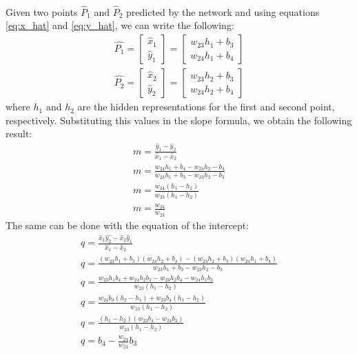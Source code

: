 \paragraph{}
Given two points $\hat{P}_1$ and $\hat{P}_2$ predicted by the network and using equations \ref{eq:x_hat} and \ref{eq:y_hat}, we can write the following:
\begin{equation}
    \begin{gathered}
        \hat{P_1} = \begin{bmatrix}
            \hat{x}_1 \\
            \hat{y}_1
        \end{bmatrix}
        = \begin{bmatrix}
            w_{23}h_1 + b_{3} \\
            w_{24}h_1 + b_{4}
        \end{bmatrix} \\
        \hat{P_2} = \begin{bmatrix}
            \hat{x}_2 \\
            \hat{y}_2
        \end{bmatrix}
        = \begin{bmatrix}
            w_{23}h_2 + b_{3} \\
            w_{24}h_2 + b_{4}
        \end{bmatrix}
    \end{gathered}
\end{equation}
where $h_1$ and $h_2$ are the hidden representations for the first and second point, respectively.
Substituting this values in the slope formula, we obtain the following result:
\begin{equation}
    \begin{gathered}
        m = \frac{\hat{y}_1 - \hat{y}_2}{\hat{x}_1 - \hat{x}_2} \\
        m = \frac{w_{24}h_1 + b_{4} - w_{24}h_2 - b_{4}}{w_{23}h_1 + b_{3} - w_{23}h_2 - b_{3}} \\
        m = \frac{w_{24}(h_1 - h_2)}{w_{23}(h_1 - h_2)} \\
        m = \frac{w_{24}}{w_{23}}
    \end{gathered}
\end{equation}
The same can be done with the equation of the intercept:
\begin{equation}
    \begin{gathered}
        q = \frac{\hat{x}_1\hat{y_2} - \hat{x}_2\hat{y}_1}{\hat{x}_1 - \hat{x}_2} \\
        q = \frac{(w_{23}h_1 + b_{3})(w_{24}h_2 + b_{4}) - (w_{23}h_2 + b_{3})(w_{24}h_1 + b_{4})}{w_{23}h_1 + b_{3} - w_{23}h_2 - b_{3}} \\
        q = \frac{w_{23}h_1b_{4} + w_{24}h_2b_{3} - w_{23}h_2b_{4} - w_{24}h_1b_{3}}{w_{23}(h_1 - h_2)} \\
        q = \frac{w_{24}b_{3}(h_2-h_1) + w_{23}b_{4}(h_1-h_2)}{w_{23}(h_1-h_2)} \\
        q = \frac{(h_1-h_2)(w_{23}b_{4} - w_{24}b_{3})}{w_{23}(h_1-h_2)} \\
        q = b_{4} - \frac{w_{24}}{w_{23}}b_{3}
    \end{gathered}
\end{equation}
